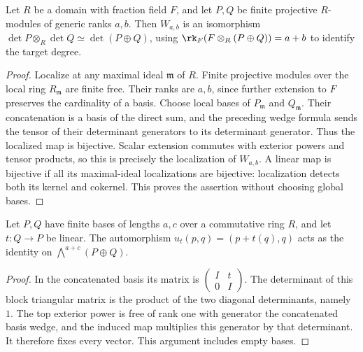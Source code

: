 \begin{lemma}
\label{lem:determinant-product}
\leanok
Let $R$ be a domain with fraction field $F$, and let $P,Q$ be finite
projective $R$-modules of generic ranks $a,b$. Then $W_{a,b}$ is an
isomorphism $\det P\otimes_R\det Q\simeq\det(P\oplus Q)$, using
$\rk_F(F\otimes_R(P\oplus Q))=a+b$ to identify the target degree.
\end{lemma}
\begin{proof}
Localize at any maximal ideal $\mathfrak m$ of $R$. Finite projective
modules over the local ring $R_{\mathfrak m}$ are finite free. Their ranks
are $a,b$, since further extension to $F$ preserves the cardinality of
a basis. Choose local bases of $P_{\mathfrak m}$ and $Q_{\mathfrak m}$.
Their concatenation is a basis of the direct sum, and the preceding wedge
formula sends the tensor of their determinant generators to its determinant
generator. Thus the localized map is bijective. Scalar extension commutes
with exterior powers and tensor products, so this is precisely the
localization of $W_{a,b}$. A linear map is bijective if all its maximal-ideal
localizations are bijective: localization detects both its kernel and
cokernel. This proves the assertion without choosing global bases.
\end{proof}

\begin{lemma}
\label{lem:determinant-shear}
\leanok
Let $P,Q$ have finite bases of lengths $a,c$ over a commutative ring $R$,
and let $t:Q\to P$ be linear. The automorphism
$u_t(p,q)=(p+t(q),q)$ acts as the identity on
$\bigwedge^{a+c}(P\oplus Q)$.
\end{lemma}
\begin{proof}
In the concatenated basis its matrix is
$\left(\begin{smallmatrix}I&t\\0&I\end{smallmatrix}\right)$.
The determinant of this block triangular matrix is the product of the
two diagonal determinants, namely $1$. The top exterior power is free of
rank one with generator the concatenated basis wedge, and the induced map
multiplies this generator by that determinant. It therefore fixes every
vector. This argument includes empty bases.
\end{proof}

